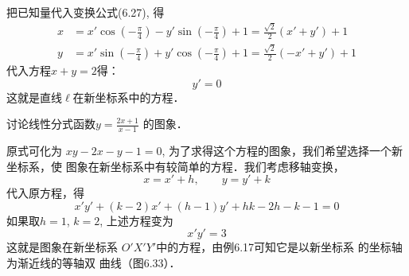 \begin{solution}
把已知量代入变换公式(6.27), 得
\[\begin{split}
 x&=x'\cos\left(-\frac{\pi}{4}\right)-y'\sin\left(-\frac{\pi}{4}\right)+1=\frac{\sqrt{2}}{2}(x'+y')+1\\
y&=x'\sin\left(-\frac{\pi}{4}\right)+y'\cos\left(-\frac{\pi}{4}\right)+1=\frac{\sqrt{2}}{2}(-x'+y')+1   
\end{split}\]
代入方程$x+y=2$得：$$y'=0$$
这就是直线$\ell$在新坐标系中的方程．
\end{solution}

\begin{example}
    讨论线性分式函数$y=\frac{2x+1}{x-1}$
    的图象．
\end{example}

\begin{solution}
    原式可化为 $xy-2x-y-1=0$, 为了求得这个方程的图象，我们希望选择一个新坐标系，使
    图象在新坐标系中有较简单的方程．我们考虑移轴变换，
\[x=x'+h,\qquad y=y'+k\]
代入原方程，得
\[x'y'+(k-2)x'+(h-1)y'+hk-2h-k-1=0\]
如果取$h=1$, $k=2$, 上述方程变为
\[x'y'=3\]
这就是图象在新坐标系
$O'X'Y'$中的方程，由例6.17可知它是以新坐标系
的坐标轴为渐近线的等轴双
曲线（图6.33）．
\end{solution}

\begin{figure}[htp]
    \centering
{}
    \caption{}
\end{figure}



